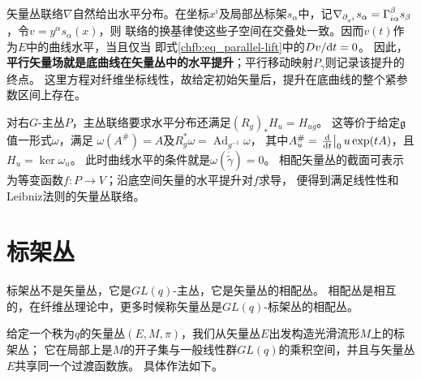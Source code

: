 \begin{example}[水平提升与平行移动]
    矢量丛联络$\nabla$自然给出水平分布。在坐标$x^i$及局部丛标架$s_\alpha$中，记$\nabla_{\partial_{x^i}}s_\alpha=\Gamma^\beta_{i\alpha}s_\beta$，令$v=y^\alpha s_\alpha(x)$，则
    联络的换基律使这些子空间在交叠处一致。因而$v(t)$作为$E$中的曲线水平，当且仅当
    即式\eqref{chfb:eq_parallel-lift}中的$D v/\dd t=0$。
    因此，\textbf{平行矢量场就是底曲线在矢量丛中的水平提升}；平行移动映射$P_\gamma$则记录该提升的终点。
    这里方程对纤维坐标线性，故给定初始矢量后，提升在底曲线的整个紧参数区间上存在。
\end{example}

对右$G$-主丛$P$，主丛联络要求水平分布还满足$(R_g)_*H_u=H_{ug}$。
这等价于给定$\mathfrak g$值一形式$\omega$，满足
$\omega(A^\#)=A$及$R_g^*\omega=\operatorname{Ad}_{g^{-1}}\omega$，
其中$A^\#_u=\left.\frac{\dd}{\dd t}\right|_0u\exp(tA)$，且$H_u=\ker\omega_u$。
此时曲线水平的条件就是$\omega(\dot{\widetilde\gamma})=0$。
相配矢量丛的截面可表示为等变函数$f:P\to V$；沿底空间矢量的水平提升对$f$求导，
便得到满足线性性和Leibniz法则的矢量丛联络。

\section{标架丛}\label{chfb:sec_frame-bundles}

标架丛不是矢量丛，它是$GL(q)$-主丛，它是矢量丛的相配丛。
相配丛是相互的，在纤维丛理论中，更多时候称矢量丛是$GL(q)$-标架丛的相配丛。

给定一个秩为$q$的矢量丛$(E,M,\pi)$，我们从矢量丛$E$出发构造光滑流形$M$上的标架丛；
它在局部上是$M$的开子集与一般线性群$GL(q)$的乘积空间，并且与矢量丛$E$共享同一个过渡函数族。
具体作法如下。

